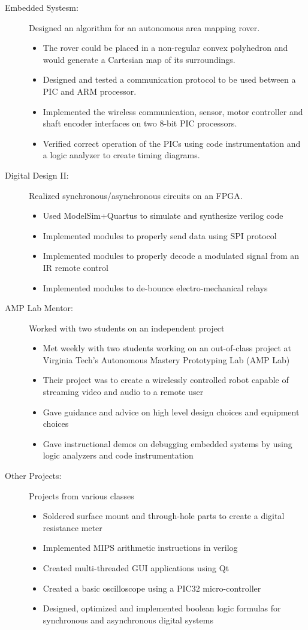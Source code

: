 \documentclass[letterpaper,11pt]{article}
\newcommand{\resitem}[1]{\item #1 \vspace{-2pt}}
\newcommand{\resheading}[1]{{\large \parashade[.9]{sharpcorners}{\textbf{#1 \vphantom{p\^{E}}}}}}
\begin{document}
\resheading{School Projects}
\begin{description}
  \item[Embedded Systesm:]
    Designed an algorithm for an autonomous area mapping
    rover.
    \begin{itemize} 
        \resitem{The rover could be placed in a non-regular convex polyhedron and
        would generate a Cartesian map of its surroundings.}
        \resitem{Designed and tested a communication protocol to be used
        between a PIC and ARM processor.}
        \resitem{Implemented the wireless communication, sensor, motor controller and shaft
        encoder interfaces on two 8-bit PIC processors.}
        \resitem{Verified correct operation of the PICs using code
        instrumentation and a logic analyzer to create timing diagrams.}
    \end{itemize}
  \item[Digital Design II:] Realized synchronous/asynchronous circuits on an
    FPGA.
    \begin{itemize}
      \resitem{Used ModelSim+Quartus to simulate and synthesize verilog code}
      \resitem{Implemented modules to properly send data using SPI protocol}
      \resitem{Implemented modules to properly decode a modulated signal from an
        IR remote control}
      \resitem{Implemented modules to de-bounce electro-mechanical relays}
    \end{itemize}

  \item[AMP Lab Mentor:] Worked with two students on an independent project
    \begin{itemize}
        \resitem{Met weekly with two students working on an out-of-class project at
        Virginia Tech's Autonomous Mastery Prototyping Lab (AMP Lab)}
      \resitem {Their project was to create a wirelessly controlled robot capable
        of streaming video and audio to a remote user}
      \resitem{Gave guidance and advice on high level design choices and equipment
        choices}
      \resitem{Gave instructional demos on debugging embedded systems by using logic analyzers and code instrumentation}
  \end{itemize}

  \item[Other Projects:] Projects from various classes
    \begin{itemize}
      \resitem{Soldered surface mount and through-hole parts to create a digital
      resistance meter}
      \resitem{Implemented MIPS arithmetic instructions in verilog}
      \resitem{Created multi-threaded GUI applications using Qt}
      \resitem{Created a basic oscilloscope using a PIC32 micro-controller}
      \resitem{Designed, optimized and implemented boolean logic formulas for
      synchronous and asynchronous digital systems}
    \end{itemize}

\end{description}
\end{document}
